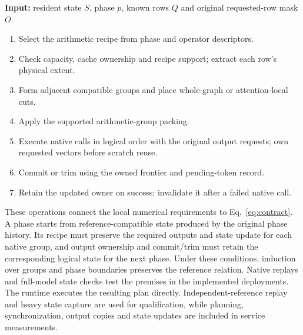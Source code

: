 \begin{table}[t]
\centering\footnotesize
\caption{Execution of one reference-derived phase.}
\label{alg:plan}
\begin{minipage}{\columnwidth}
\textbf{Input:} resident state $S$, phase $p$, known rows $Q$ and original requested-row mask $O$.
\begin{enumerate}[leftmargin=1.6em,itemsep=2pt,topsep=4pt]
\item Select the arithmetic recipe from phase and operator descriptors.
\item Check capacity, cache ownership and recipe support; extract each row's physical extent.
\item Form adjacent compatible groups and place whole-graph or attention-local cuts.
\item Apply the supported arithmetic-group packing.
\item Execute native calls in logical order with the original output requests; own requested vectors before scratch reuse.
\item Commit or trim using the owned frontier and pending-token record.
\item Retain the updated owner on success; invalidate it after a failed native call.
\end{enumerate}
\end{minipage}
\end{table}

These operations connect the local numerical requirements to Eq.~\eqref{eq:contract}. A phase starts from reference-compatible state produced by the original phase history. Its recipe must preserve the required outputs and state update for each native group, and output ownership and commit/trim must retain the corresponding logical state for the next phase. Under these conditions, induction over groups and phase boundaries preserves the reference relation. Native replays and full-model state checks test the premises in the implemented deployments. The runtime executes the resulting plan directly. Independent-reference replay and heavy state capture are used for qualification, while planning, synchronization, output copies and state updates are included in service measurements.
